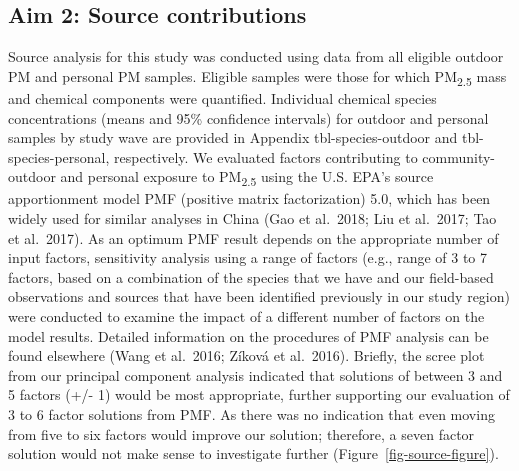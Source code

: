 \documentclass[
  letterpaper,
  DIV=11,
  numbers=noendperiod]{scrartcl}
\makeatletter
\renewenvironment{table}%
   {\renewcommand\familydefault\sfdefault
    \@float{table}}
   {\end@float}
\makeatother
\begin{document}
\begin{table}
{}

\end{table}%

\subsection{Aim 2: Source
contributions}\label{aim-2-source-contributions}

Source analysis for this study was conducted using data from all
eligible outdoor PM and personal PM samples. Eligible samples were those
for which PM\textsubscript{2.5} mass and chemical components were
quantified. Individual chemical species concentrations (means and 95\%
confidence intervals) for outdoor and personal samples by study wave are
provided in Appendix tbl-species-outdoor and tbl-species-personal,
respectively.  We evaluated factors contributing to
community-outdoor and personal exposure to PM\textsubscript{2.5} using
the U.S. EPA's source apportionment model PMF (positive matrix
factorization) 5.0, which has been widely used for similar analyses in
China (Gao et al.~2018; Liu et al.~2017; Tao et al.~2017). As an optimum
PMF result depends on the appropriate number of input factors,
sensitivity analysis using a range of factors (e.g., range of 3 to 7
factors, based on a combination of the species that we have and our
field-based observations and sources that have been identified
previously in our study region) were conducted to examine the impact of
a different number of factors on the model results. Detailed information
on the procedures of PMF analysis can be found elsewhere (Wang et
al.~2016; Zíková et al.~2016). Briefly, the scree plot from our
principal component analysis indicated that solutions of between 3 and 5
factors (+/- 1) would be most appropriate, further supporting our
evaluation of 3 to 6 factor solutions from PMF. As there was no
indication that even moving from five to six factors would improve our
solution; therefore, a seven factor solution would not make sense to
investigate further (Figure~\ref{fig-source-figure}).
\end{document}
